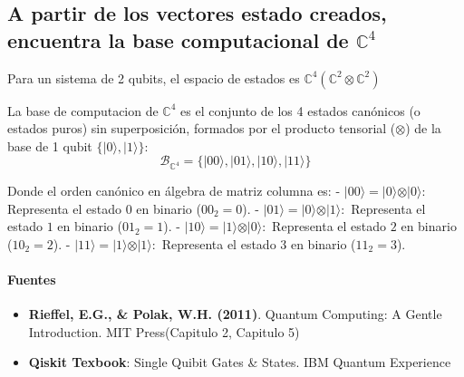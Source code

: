 \documentclass[11pt]{article}
\providecommand{\tightlist}{%
      \setlength{\itemsep}{0pt}\setlength{\parskip}{0pt}}
\begin{document}
    
    \subsection{\texorpdfstring{A partir de los vectores estado creados,
encuentra la base computacional de
\(\mathbb{C}^4\)}{A partir de los vectores estado creados, encuentra la base computacional de \textbackslash mathbb\{C\}\^{}4}}\label{a-partir-de-los-vectores-estado-creados-encuentra-la-base-computacional-de-mathbbc4}

Para un sistema de 2 qubits, el espacio de estados es
\(\mathbb{C}^4 (\mathbb{C}^2 \otimes \mathbb{C}^2)\)

La base de computacion de \(\mathbb{C}^4\) es el conjunto de los 4
estados canónicos (o estados puros) sin superposición, formados por el
producto tensorial (\(\otimes\)) de la base de 1 qubit
\(\{\vert{}0\rangle, \vert{}1\rangle\}\): \[
\mathcal{B}_{\mathbb{C}^4} = \{\vert{00}\rangle, \vert{01}\rangle, \vert{10}\rangle, \vert{11}\rangle\}
\]

Donde el orden canónico en álgebra de matriz columna es: -
\(\vert{00}\rangle = \vert{0}\rangle \otimes \vert{0}\rangle:\)
Representa el estado \(0\) en binario (\(00_2 = 0\)). -
\(\vert{01}\rangle = \vert{0}\rangle \otimes \vert{1}\rangle:\)
Representa el estado \(1\) en binario (\(01_2 = 1\)). -
\(\vert{10}\rangle = \vert{1}\rangle \otimes \vert{0}\rangle:\)
Representa el estado \(2\) en binario (\(10_2 = 2\)). -
\(\vert{11}\rangle = \vert{1}\rangle \otimes \vert{1}\rangle:\)
Representa el estado \(3\) en binario (\(11_2 = 3\)).

\paragraph{Fuentes}\label{fuentes}

\begin{itemize}
\tightlist
\item
  \textbf{Rieffel, E.G., \& Polak, W.H. (2011)}. Quantum Computing: A
  Gentle Introduction. MIT Press(Capitulo 2, Capitulo 5)
\item
  \textbf{Qiskit Texbook}: Single Quibit Gates \& States. IBM Quantum
  Experience
\end{itemize}
\end{document}
